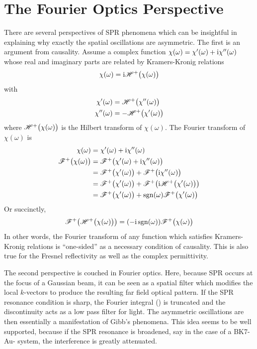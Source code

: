 \section{The Fourier Optics Perspective}
There are several perspectives of SPR phenomena which can be insightful in
explaining why exactly the spatial oscillations are asymmetric.  The first
is an argument from causality.  Assume a complex function $\chi(\omega) =
\chi'(\omega) + {\mathrm{i}} \chi''(\omega)$ whose real and imaginary parts are
related by Kramers-Kronig relations
\begin{align}
\chi(\omega)={\mathrm{i}} {\mathscr{H}^{+}\bigl(\chi(\omega)\bigr)}
\end{align}
with 
\begin{align}
\chi'(\omega) &= {\mathscr{H}^{+}\bigl(\chi''(\omega)\bigr)}\\
\chi''(\omega) &= -{\mathscr{H}^{+}\bigl(\chi'(\omega)\bigr)}
\end{align}
where ${\mathscr{H}^{+}\bigl(\chi(\omega)\bigr)}$ is the Hilbert transform of $\chi(\omega)$.
The Fourier transform of $\chi(\omega)$ is
\begin{align}
\chi(\omega) &= \chi'(\omega) + {\mathrm{i}} \chi''(\omega)\\
{\mathscr{F}^{+}\bigl(\chi(\omega)\bigr)} &= {\mathscr{F}^{+}\bigl(\chi'(\omega) + {\mathrm{i}} \chi''(\omega)\bigr)}\\
&= {\mathscr{F}^{+}\bigl(\chi'(\omega)\bigr)} + {\mathscr{F}^{+}\bigl({\mathrm{i}} \chi''(\omega)\bigr)}\\
&= {\mathscr{F}^{+}\bigl(\chi'(\omega)\bigr)} + {\mathscr{F}^{+}\bigl({\mathrm{i}} {\mathscr{H}^{+}\bigl(\chi'(\omega)\bigr)}\bigr)} \\
&= {\mathscr{F}^{+}\bigl(\chi'(\omega)\bigr)} + \operatorname{sgn}(\omega) {\mathscr{F}^{+}\bigl(\chi'(\omega)\bigr)} \\
\end{align}
Or succinctly,
\begin{align}
{\mathscr{F}^{+}\bigl({\mathscr{H}^{+}\bigl(\chi(\omega)\bigr)}\bigr)} = (-{\mathrm{i}} \operatorname{sgn}(\omega)) {\mathscr{F}^{+}\bigl(\chi(\omega)\bigr)}
\end{align}
In other words, the Fourier transform of any function which satisfies
Kramers-Kronig relations is ``one-sided'' as a necessary
condition of causality.  This is also true for the Fresnel
reflectivity as well as the complex permittivity.

The second perspective is couched in Fourier optics.  Here, because SPR
occurs at the focus of a Gaussian beam, it can be seen as a spatial filter
which modifies the local $k$-vectors to produce the resulting far field
optical pattern.  If the SPR resonance condition is sharp, the Fourier
integral () is truncated and the discontinuity
acts as a low pass filter for light.  The asymmetric oscillations are then
essentially a manifestation of Gibb's phenomena.  This idea seems to be
well supported, because if the SPR resonance is broadened, say in the case
of a BK7-Au- system, the interference is greatly attenuated.
